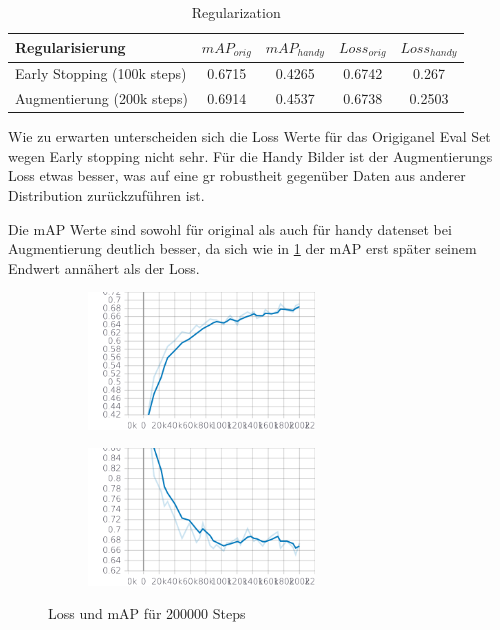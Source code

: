 \begin{table}[htb]
    \centering
    \label{tab:regularization}
    \begin{tabular}{| l || c | c | c | c |} 
        \hline
        Regularisierung & $mAP_{orig}$ & $mAP_{handy}$ & $Loss_{orig}$ &  $Loss_{handy}$\\
        \hline
        Early Stopping (100k steps) & 0.6715 & 0.4265 & 0.6742 & 0.267\\
        \hline
        Augmentierung (200k steps) & 0.6914 & 0.4537 & 0.6738 & 0.2503\\ %
        \hline
    \end{tabular}        
    \caption{Regularization}
\end{table}

Wie zu erwarten unterscheiden sich die Loss Werte für das Origiganel 
Eval Set wegen Early stopping nicht sehr. Für die Handy Bilder ist 
der Augmentierungs Loss etwas besser, was auf eine gr robustheit 
gegenüber Daten aus anderer Distribution zurückzuführen ist.

Die mAP Werte sind sowohl für original als auch für handy datenset 
bei Augmentierung deutlich besser, da sich wie in \ref{plot:map_loss} 
der mAP erst später seinem Endwert annähert als der Loss.



\begin{figure}[htb]
    \centering
    \begin{subfigure}{6cm}
        \centering
        \includegraphics[width=6cm]{./Bilder/eval/mAP.png} %
    \end{subfigure}
    \begin{subfigure}{6cm}
        \centering
        \includegraphics[width=6cm]{./Bilder/eval/loss.png}
    \end{subfigure}
    \caption{Loss und mAP für 200000 Steps}
    \label{plot:map_loss}
\end{figure}


